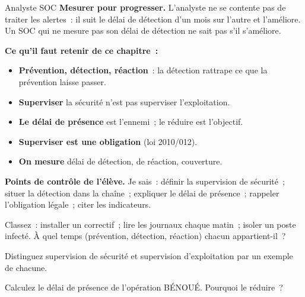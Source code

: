 \begin{boxmetier}{Analyste SOC}
\textbf{Mesurer pour progresser.} L'analyste ne se contente pas de traiter
les alertes~: il suit le délai de détection d'un mois sur l'autre et
l'améliore. Un SOC qui ne mesure pas son délai de détection ne sait pas s'il
s'améliore.
\end{boxmetier}

\separateur

\begin{boxresume}
\textbf{Ce qu'il faut retenir de ce chapitre~:}
\begin{itemize}
    \item \textbf{Prévention, détection, réaction}~: la détection rattrape ce
          que la prévention laisse passer.
    \item \textbf{Superviser} la sécurité n'est pas superviser l'exploitation.
    \item \textbf{Le délai de présence} est l'ennemi~; le réduire est
          l'objectif.
    \item \textbf{Superviser est une obligation} (loi 2010/012).
    \item \textbf{On mesure} délai de détection, de réaction, couverture.
\end{itemize}
\end{boxresume}

\begin{boxinfo}
\textbf{Points de contrôle de l'élève.} Je sais~: définir la supervision de
sécurité~; situer la détection dans la chaîne~; expliquer le délai de
présence~; rappeler l'obligation légale~; citer les indicateurs.
\end{boxinfo}

\bigskip

\begin{boxexo}[title={\ding{45}\quad Exercice~1.1. Trois temps \niveaubase}]
Classez~: installer un correctif~; lire les journaux chaque matin~; isoler un
poste infecté. À quel temps (prévention, détection, réaction) chacun
appartient-il~?
\end{boxexo}

\begin{boxexo}[title={\ding{45}\quad Exercice~1.2. Deux supervisions \niveaubase}]
Distinguez supervision de sécurité et supervision d'exploitation par un
exemple de chacune.
\end{boxexo}

\begin{boxexo}[title={\ding{45}\quad Exercice~1.3. Le délai \niveaubase}]
Calculez le délai de présence de l'opération BÉNOUÉ. Pourquoi le réduire~?
\end{boxexo}

